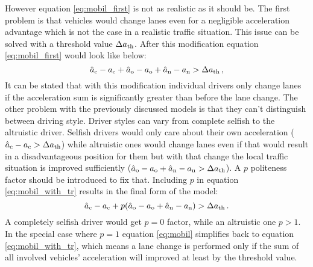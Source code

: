 			However equation \ref{eq:mobil_first} is not as realistic as it should be. The first problem is that vehicles would change lanes  even for a negligible acceleration advantage which is not the case in a realistic traffic situation. This issue can be solved with a threshold value $\Delta  a_{\rm th}$. After this modification equation \ref{eq:mobil_first} would look like below:
			\begin{equation}
				\hat{a}_{\rm c} - a_{\rm c} + \hat{a}_{\rm o} - a_{\rm o} + \hat{a}_{\rm n} - a_{\rm n} > \Delta  a_{\rm th}\,,
				\label{eq:mobil_with_tr}
			\end{equation}
			It can be stated that with this modification individual drivers only change lanes if the acceleration sum is significantly greater than before the lane change. The other problem with the previously discussed models is that they can't distinguish between driving style. Driver styles can vary from complete selfish to the altruistic driver. Selfish drivers would only care about  their own acceleration ($\hat{a}_{\rm c} - a_{\rm c} > \Delta  a_{\rm th}$) while altruistic ones would change lanes even if that would result in a disadvantageous position for them but with that change the local traffic situation is improved sufficiently ($\hat{a}_{\rm o} - a_{\rm o} + \hat{a}_{\rm n} - a_{\rm n} > \Delta  a_{\rm th}$). A $p$ politeness factor should be introduced to fix that. Including $p$ in equation \ref{eq:mobil_with_tr} results in the final form of the model:
			\begin{equation}
				\hat{a}_{\rm c} - a_{\rm c} + p(\hat{a}_{\rm o} - a_{\rm o} + \hat{a}_{\rm n} - a_{\rm n}) > \Delta  a_{\rm th}\,.
				\label{eq:mobil}
			\end{equation}
			A completely selfish driver would get $p=0$ factor, while an altruistic one $p>1$. In the special case where $p=1$ equation \ref{eq:mobil} simplifies back to equation \ref{eq:mobil_with_tr}, which means a lane change is performed only if the sum of all involved vehicles' acceleration will improved at least by the threshold value.
